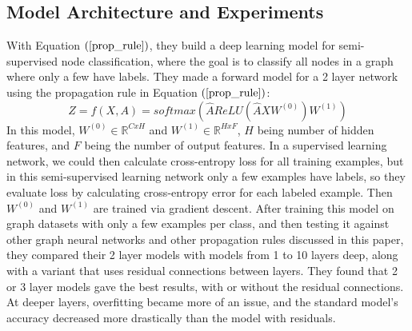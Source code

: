\subsection{Model Architecture and Experiments}
With Equation $(\ref{prop_rule})$, they build a deep learning model for semi-supervised node classification, where the goal is to classify all nodes in a graph where only a few have labels. They made a forward model for a 2 layer network using the propagation rule in Equation $(\ref{prop_rule})$:
\begin{equation}
\label{forward_model}
Z = f(X, A) = softmax(\hat{A} ReLU(\hat{A}XW^{(0)})W^{(1)})
\end{equation}
In this model, $W^{(0)} \in \mathbb{R}^{C x H}$ and $W^{(1)} \in \mathbb{R}^{H x F}$, $H$ being number of hidden features, and $F$ being the number of output features.
In a supervised learning network, we could then calculate cross-entropy loss for all training examples, but in this semi-supervised learning network only a few examples have labels, so they evaluate loss by calculating cross-entropy error for each labeled example. Then $W^{(0)}$ and $W^{(1)}$ are trained via gradient descent.
After training this model on graph datasets with only a few examples per class, and then testing it against other graph neural networks and other propagation rules discussed in this paper, they compared their 2 layer models with models from 1 to 10 layers deep, along with a variant that uses residual connections between layers. They found that 2 or 3 layer models gave the best results, with or without the residual connections. At deeper layers, overfitting became more of an issue, and the standard model's accuracy decreased more drastically than the model with residuals.